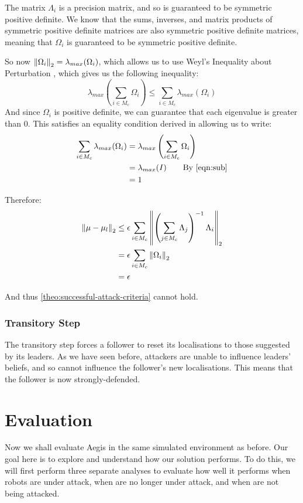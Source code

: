 The matrix $\Lambda_i$ is a precision matrix, and so is guaranteed to be symmetric positive definite. We know that the sums, inverses, and matrix products of symmetric positive definite matrices are also symmetric positive definite matrices, meaning that $\Omega_i$ is guaranteed to be symmetric positive definite.

So now $\left\lVert\Omega_i\right\rVert_2 = \lambda_{max}(\Omega_i)$, which allows us to use Weyl's Inequality about Perturbation \cite{weyls}, which gives us the following inequality:
\begin{equation}
    \lambda_{max}\left(\sum_{i \in M_c} \Omega_i\right) \leq \sum_{i \in M_c} \lambda_{max}(\Omega_i)
\end{equation}
And since $\Omega_i$ is positive definite, we can guarantee that each eigenvalue is greater than 0. This satisfies an equality condition derived in \cite{weyls_equality} allowing us to write:
\begin{align}
    \sum_{i \in M_c} \lambda_{max}(\Omega_i) &= \lambda_{max}\left(\sum_{i \in M_c} \Omega_i\right)\\
    &= \lambda_{max}(I) \tag*{\text{By \ref{eqn:sub}}}\\
    &= 1
\end{align}

Therefore:
\begin{align}
    \left\lVert\mu - \mu_l\right\rVert_2 &\leq \epsilon\sum_{i \in M_c} \left\lVert\left(\sum_{j \in M_c} \Lambda_j\right)^{-1} \Lambda_i\right\rVert_2\\
    &= \epsilon \sum_{i \in M_c} \left\lVert\Omega_i\right\rVert_2\\
    &= \epsilon
\end{align}

And thus \ref{theo:successful-attack-criteria} cannot hold.\\

\subsubsection{Transitory Step}
The transitory step forces a follower to reset its localisations to those suggested by its leaders. As we have seen before, attackers are unable to influence leaders' beliefs, and so cannot influence the follower's new localisations. This means that the follower is now strongly-defended.

\section{Evaluation} \label{section:eval-def}
Now we shall evaluate Aegis in the same simulated environment as before. Our goal here is to explore and understand how our solution performs. To do this, we will first perform three separate analyses to evaluate how well it performs when robots are under attack, when are no longer under attack, and when are not being attacked. 

